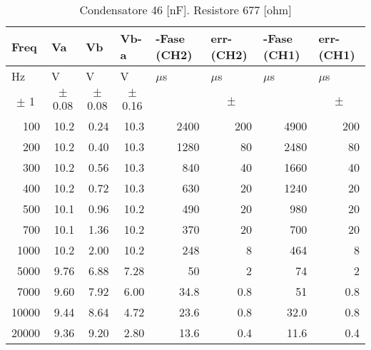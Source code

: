 \begin{table}[H]
\begin{center}
\begin{tabular}{|r|r|r|r|r|r|r|r|}
\hline
\multicolumn{1}{|l|}{Freq} & \multicolumn{1}{l|}{Va} & \multicolumn{1}{l|}{Vb} & \multicolumn{1}{l|}{Vb-a} & \multicolumn{1}{l|}{-Fase (CH2)} & \multicolumn{1}{l|}{err-(CH2)} & \multicolumn{1}{l|}{-Fase (CH1)} & \multicolumn{1}{l|}{err-(CH1)} \\ \hline
\multicolumn{1}{|l|}{Hz} & \multicolumn{1}{l|}{V} & \multicolumn{1}{l|}{V} & \multicolumn{1}{l|}{V} & \multicolumn{1}{l|}{$\mu$s} & \multicolumn{1}{l|}{$\mu$s} & \multicolumn{1}{l|}{$\mu$s} & \multicolumn{1}{l|}{$\mu$s} \\ \hline
\multicolumn{1}{|c|}{$\pm$ 1} & \multicolumn{1}{c|}{$\pm$ 0.08} & \multicolumn{1}{c|}{$\pm$ 0.08} & \multicolumn{1}{c|}{$\pm$ 0.16} & \multicolumn{1}{l|}{} & \multicolumn{1}{c|}{$\pm$ } & \multicolumn{1}{l|}{} & \multicolumn{1}{c|}{$\pm$ } \\ \hline
100 & 10.2 & 0.24 & 10.3 & 2400 & 200 & 4900 & 200 \\ \hline
200 & 10.2 & 0.40 & 10.3 & 1280 & 80 & 2480 & 80 \\ \hline
300 & 10.2 & 0.56 & 10.3 & 840 & 40 & 1660 & 40 \\ \hline
400 & 10.2 & 0.72 & 10.3 & 630 & 20 & 1240 & 20 \\ \hline
500 & 10.1 & 0.96 & 10.2 & 490 & 20 & 980 & 20 \\ \hline
700 & 10.1 & 1.36 & 10.2 & 370 & 20 & 700 & 20 \\ \hline
1000 & 10.2 & 2.00 & 10.2 & 248 & 8 & 464 & 8 \\ \hline
5000 & 9.76 & 6.88 & 7.28 & 50 & 2 & 74 & 2 \\ \hline
7000 & 9.60 & 7.92 & 6.00 & 34.8 & 0.8 & 51 & 0.8 \\ \hline
10000 & 9.44 & 8.64 & 4.72 & 23.6 & 0.8 & 32.0 & 0.8 \\ \hline
20000 & 9.36 & 9.20 & 2.80 & 13.6 & 0.4 & 11.6 & 0.4 \\ \hline
\end{tabular}
\end{center}
\caption{Condensatore 46 [nF]. Resistore 677 [ohm]}
\label{C3_P1_cond2}
\end{table}